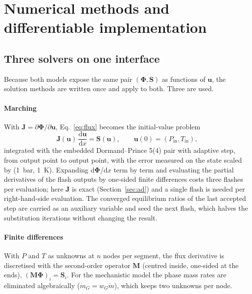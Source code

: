 \documentclass[a4paper,fleqn]{cas-sc}
\newcommand{\mdot}{\dot{m}}
\newcommand{\dd}{\mathrm{d}}
\newcommand{\bPhi}{\boldsymbol{\Phi}}
\newcommand{\bS}{\mathbf{S}}
\newcommand{\bu}{\mathbf{u}}
\newcommand{\bJ}{\mathbf{J}}
\begin{document}
\section{Numerical methods and differentiable implementation}\label{sec:numerics}

\subsection{Three solvers on one interface}\label{sec:solvers}

Because both models expose the same pair $(\bPhi, \bS)$ as functions of $\bu$, the solution methods are written once and apply to both. Three are used.

\paragraph{Marching} With $\bJ = \partial\bPhi/\partial\bu$, Eq.~\eqref{eq:flux} becomes the initial-value problem
\begin{equation}\label{eq:march}
\bJ(\bu)\,\frac{\dd\bu}{\dd x} = \bS(\bu), \qquad \bu(0) = (P_\mathrm{in}, T_\mathrm{in}),
\end{equation}
integrated with the embedded Dormand--Prince 5(4) pair \citep{dormand1980} with adaptive step, from output point to output point, with the error measured on the state scaled by (\SI{1}{\bar}, \SI{1}{\kelvin}). Expanding $\dd\bPhi/\dd x$ term by term and evaluating the partial derivatives of the flash outputs by one-sided finite differences costs three flashes per evaluation; here $\bJ$ is exact (Section~\ref{sec:ad}) and a single flash is needed per right-hand-side evaluation. The converged equilibrium ratios of the last accepted step are carried as an auxiliary variable and seed the next flash, which halves the substitution iterations without changing the result.

\paragraph{Finite differences} With $P$ and $T$ as unknowns at $n$ nodes per segment, the flux derivative is discretised with the second-order operator $\mathbf{M}$ (centred inside, one-sided at the ends), $(\mathbf{M}\bPhi)_i = \bS_i$. For the mechanistic model the phase mass rates are eliminated algebraically ($\mdot_G = w_G\mdot$), which keeps two unknowns per node.
\end{document}

